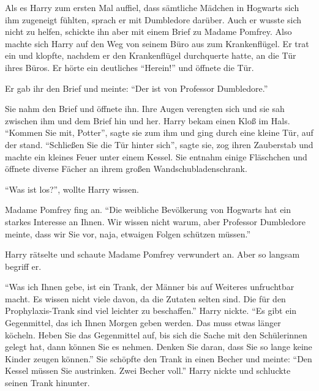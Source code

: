 \begin{safedivide}
\fskdivider
\end{safedivide}

\onelineback %

\begin{rueckblick}
Als es Harry zum ersten Mal auffiel, dass sämtliche Mädchen in Hogwarts sich ihm zugeneigt fühlten, sprach er mit Dumbledore darüber. Auch er wusste sich nicht zu helfen, schickte ihn aber mit einem Brief zu Madame Pomfrey. Also machte sich Harry auf den Weg von seinem Büro aus zum Krankenflügel. Er trat ein und klopfte, nachdem er den Krankenflügel durchquerte hatte, an die Tür ihres Büros. Er hörte ein deutliches \enquote{Herein!} und öffnete die Tür.

Er gab ihr den Brief und meinte: \enquote{Der ist von Professor Dumbledore.}

Sie nahm den Brief und öffnete ihn. Ihre Augen verengten sich und sie sah zwischen ihm und dem Brief hin und her. Harry bekam einen Kloß im Hals. \enquote{Kommen Sie mit, Potter}, sagte sie zum ihm und ging durch eine kleine Tür, auf der  stand. \enquote{Schließen Sie die Tür hinter sich}, sagte sie, zog ihren Zauberstab und machte ein kleines Feuer unter einem Kessel. Sie entnahm einige Fläschchen und öffnete diverse Fächer an ihrem großen Wandschubladenschrank.

\enquote{Was ist los?}, wollte Harry wissen.

Madame Pomfrey fing an. \enquote{Die weibliche Bevölkerung von Hogwarts hat ein starkes Interesse an Ihnen. Wir wissen nicht warum, aber Professor Dumbledore meinte, dass wir Sie vor, naja, etwaigen Folgen schützen müssen.}

Harry rätselte und schaute Madame Pomfrey verwundert an. Aber so langsam begriff er.

\enquote{Was ich Ihnen gebe, ist ein Trank, der Männer bis auf Weiteres unfruchtbar macht. Es wissen nicht viele davon, da die Zutaten selten sind. Die für den Prophylaxis-Trank sind viel leichter zu beschaffen.} Harry nickte. \enquote{Es gibt ein Gegenmittel, das ich Ihnen Morgen geben werden. Das muss etwas länger köcheln. Heben Sie das Gegenmittel auf, bis sich die Sache mit den Schülerinnen gelegt hat, dann können Sie es nehmen. Denken Sie daran, dass Sie so lange keine Kinder zeugen können.} Sie schöpfte den Trank in einen Becher und meinte: \enquote{Den Kessel müssen Sie austrinken. Zwei Becher voll.} Harry nickte und schluckte seinen Trank hinunter.
\end{rueckblick}

